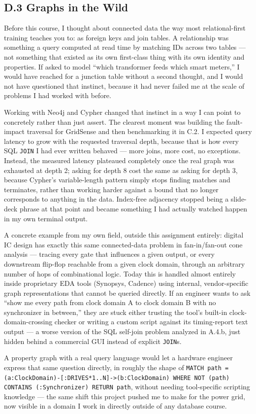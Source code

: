 \documentclass[11pt, a4paper]{article}
\makeatletter
\renewcommand{\_}{\origunderscore\penalty\z@\hskip\z@skip}
\renewcommand{\{}{\origlbrace\penalty\z@\hskip\z@skip}
\renewcommand{\}}{\origrbrace\penalty\z@\hskip\z@skip}
\makeatother
\begin{document}
\subsection*{D.3 Graphs in the Wild}

Before this course, I thought about connected data the way most relational-first training teaches you to: as foreign keys and join tables. A relationship was something a query computed at read time by matching IDs across two tables --- not something that existed as its own first-class thing with its own identity and properties. If asked to model ``which transformer feeds which smart meters,'' I would have reached for a junction table without a second thought, and I would not have questioned that instinct, because it had never failed me at the scale of problems I had worked with before.

Working with Neo4j and Cypher changed that instinct in a way I can point to concretely rather than just assert. The clearest moment was building the fault-impact traversal for GridSense and then benchmarking it in C.2. I expected query latency to grow with the requested traversal depth, because that is how every SQL \texttt{JOIN} I had ever written behaved --- more joins, more cost, no exceptions. Instead, the measured latency plateaued completely once the real graph was exhausted at depth 2; asking for depth 8 cost the same as asking for depth 3, because Cypher's variable-length pattern simply stops finding matches and terminates, rather than working harder against a bound that no longer corresponds to anything in the data. Index-free adjacency stopped being a slide-deck phrase at that point and became something I had actually watched happen in my own terminal output.

A concrete example from my own field, outside this assignment entirely: digital IC design has exactly this same connected-data problem in fan-in/fan-out cone analysis --- tracing every gate that influences a given output, or every downstream flip-flop reachable from a given clock domain, through an arbitrary number of hops of combinational logic. Today this is handled almost entirely inside proprietary EDA tools (Synopsys, Cadence) using internal, vendor-specific graph representations that cannot be queried directly. If an engineer wants to ask ``show me every path from clock domain A to clock domain B with no synchronizer in between,'' they are stuck either trusting the tool's built-in clock-domain-crossing checker or writing a custom script against its timing-report text output --- a worse version of the SQL self-join problem analyzed in A.4.b, just hidden behind a commercial GUI instead of explicit \texttt{JOIN}s.

A property graph with a real query language would let a hardware engineer express that same question directly, in roughly the shape of \texttt{MATCH path = (a:ClockDomain)-[:DRIVES*1..N]->(b:ClockDomain) WHERE NOT (path) CONTAINS (:Synchronizer) RETURN path}, without needing tool-specific scripting knowledge --- the same shift this project pushed me to make for the power grid, now visible in a domain I work in directly outside of any database course.




\end{document}
